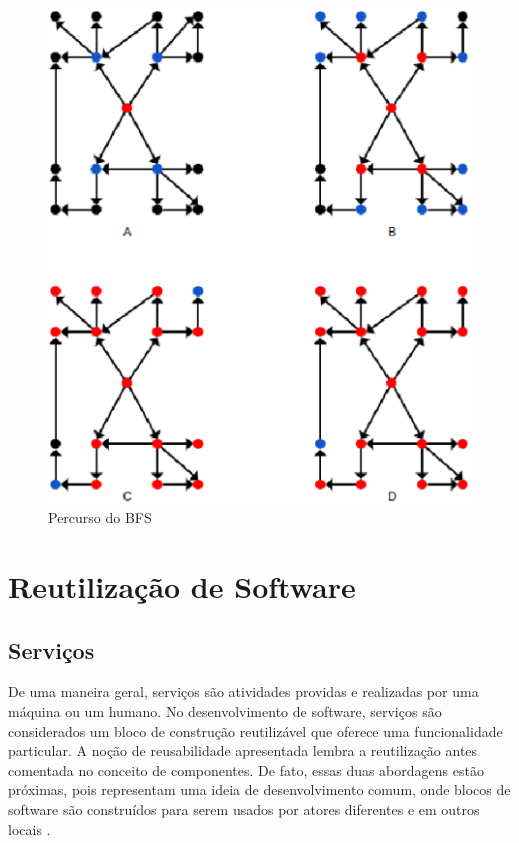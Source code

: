 \begin{apendicesenv}
\begin{figure}[!h]
	\centering
	\includegraphics[scale=0.55]{figuras/referencial_teorico/bfs.eps}
	\caption[Percurso do BFS]{Percurso do BFS \cite{Brassard:1988}}
	\label{bfs}
\end{figure}

\chapter{Reutilização de Software}
\label{chapter:reutilizacao_software}

\section{Serviços}
\label{sec:servicos}

De uma maneira geral, serviços são atividades providas e realizadas por uma máquina ou um humano. No desenvolvimento de software, serviços são considerados um bloco de construção reutilizável que oferece uma funcionalidade particular. A noção de reusabilidade apresentada lembra a reutilização antes comentada no conceito de componentes. De fato, essas duas abordagens estão próximas, pois representam uma ideia de desenvolvimento comum, onde blocos de software são construídos para serem usados por atores diferentes e em outros locais \cite{Stojanovic:Dahanayake:2005}.


\end{apendicesenv}
